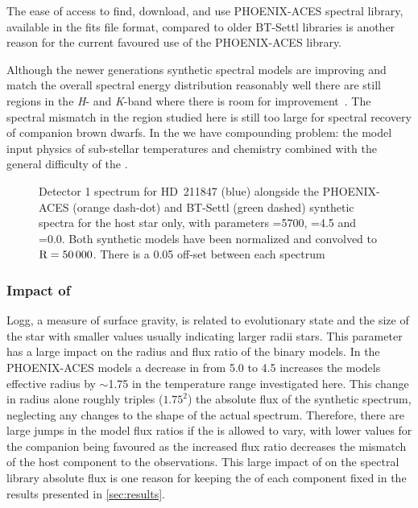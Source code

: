 The ease of access to find, download, and use {PHOENIX-ACES} spectral library, available in the fits file format, compared to older {BT-Settl} libraries is another reason for the current favoured use of the {PHOENIX-ACES} library.

Although the newer generations synthetic spectral models are improving and match the overall spectral energy distribution reasonably well there are still regions in the \emph{H}- and \emph{K}-band where there is room for improvement~\citet{rajpurohit_spectral_2016}.
The spectral mismatch in the region studied here is still too large for spectral recovery of companion brown dwarfs.
In the \nir{} we have compounding problem: the model input physics of sub-stellar temperatures and chemistry combined with the general difficulty of the \nir{}.

\begin{figure}
    \centering
    \caption{Detector 1 spectrum for {HD~211847} (blue) alongside the {PHOENIX-ACES} (orange dash-dot) and {BT-Settl} (green dashed) synthetic spectra for the host star only, with parameters \Teff{}=5700\K{}, \logg{}=4.5 and \feh{}=0.0.
        Both synthetic models have been normalized and convolved to \(\rm R=50\,000\).
        There is a 0.05 off-set between each spectrum}
    \label{fig:hd211847-models}
\end{figure}


\subsubsection{Impact of \logg{}}
\label{subsubsec:logg}
Logg, a measure of surface gravity, is related to evolutionary state and the size of the star with smaller \logg{} values usually indicating larger radii stars.
This parameter has a large impact on the radius and flux ratio of the binary models.
In the {PHOENIX-ACES} models a decrease in \logg{} from 5.0 to 4.5 increases the models effective radius by \(\sim\)1.75 in the temperature range investigated here.
This change in radius alone roughly triples (\(1.75^2\)) the absolute flux of the synthetic spectrum, neglecting any changes to the shape of the actual spectrum.
Therefore, there are large jumps in the model flux ratios if the \logg{} is allowed to vary, with lower \logg{} values for the companion being favoured as the increased flux ratio decreases the mismatch of the host component to the observations.
This large impact of \logg{} on the spectral library absolute flux is one reason for keeping the \logg{} of each component fixed in the \textchisquared{} results presented in \cref{sec:results}.

